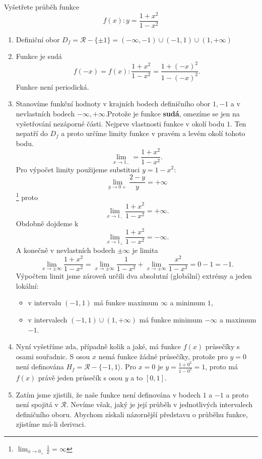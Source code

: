     \begin{example}Vyšetřete průběh funkce
       $$f(x):y=\frac{1+x^2}{1-x^2}$$
       \begin{enumerate}
         \item Definiční obor $D_f=\mathcal{R}-\{±1\}=(-\infty,-1)\cup(-1,1)\cup(1,+\infty)$
         \item Funkce je sudá $$f(-x)=f(x): \frac{1+x^2}{1-x^2}=\frac{1+(-x)^2}{1-(-x)^2}.$$ Funkce není periodická.
         \item Stanovíme funkční hodnoty v krajních bodech definičního obor $1, -1$ a v nevlastních bodech $-\infty,+\infty$.Protože je funkce \textbf{sudá}, omezíme
               se jen na vyšetřování nezáporné části. Nejprve vlastnosti fun\-kce v okolí bodu $1$. Ten nepatří do $D_f$ a proto určíme limity funkce v pravém a 
               levém okolí tohoto bodu. $$\lim_{x\to 1_{-}}=\frac{1+x^2}{1-x^2}.$$ Pro výpočet limity použijeme substituci $y=1-x^2$: 
               $$\lim_{y\to0+}\frac{2-y}{y}=+\infty$$ 
               \footnote{$\lim_{x\to0_+}\frac{1}{x}=\infty$} proto $$\lim_{x\to1_{-}}\frac{1+x^2}{1-x^2}=+\infty.$$ Obdobně dojdeme k 
               $$\lim_{x\to1_+}\frac{1+x^2}{1-x^2}=-\infty.$$ A konečně v nevlastních bodech $±\infty$ je limita 
               $$\lim_{x\to±\infty}\frac{1+x^2}{1-x^2}=\lim_{x\to\pm\infty}\frac{1}{1-x^2}+\lim_{x\to\pm\infty}\frac{x^2}{1-x^2 }=0-1=-1.$$ Výpočtem limit jsme 
               zároveň určili dva absolutní (globální) extrémy a jeden lokální:
               \begin{itemize}
                 \item v intervalu $(-1,1)$ má funkce maximum $\infty$ a minimum $1$,
                 \item v intervalech $(-1,1)\cup(1,+\infty)$ má funkce minimum $-\infty$ a maximum $-1$.
               \end{itemize}
         \item Nyní vyšetříme zda, případně kolik a jaké, má funkce $f(x)$ průsečíky s osami souřadnic.  S osou $x$ nemá funkce žádné průsečíky, protože pro $y=0$ 
               není definována $H_f=\mathcal{R}-\{-1,1\rangle$. Pro $x=0$ je $y=\frac{1+0^2}{1-0^2}=1$, proto má $f(x)$ právě jeden průsečík s osou $y$ a to $[0,1]$.
         \item Zatím jsme zjistili, že naše funkce není definována v bodech $1$ a $-1$ a proto není spojitá v $\mathcal{R}$. Nevíme však, jaký je její průběh v 
               jednotlivých intervalech definičního oboru.  Abychom získali názornější představu o průběhu funkce, zjistíme má-li derivaci.

\end{enumerate}
\end{example}
